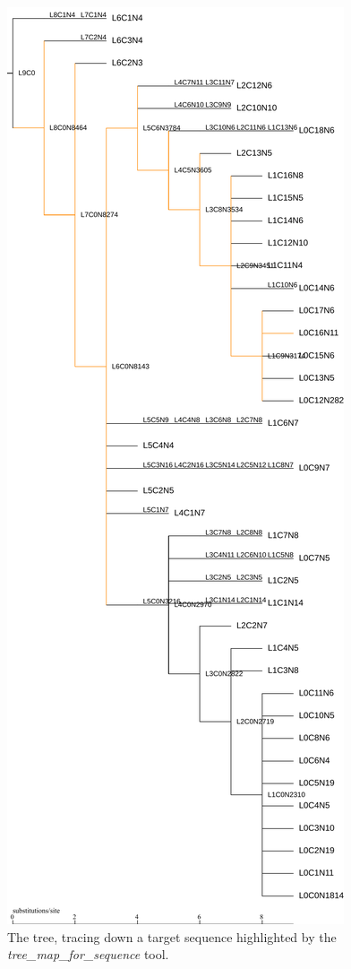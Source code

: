 \begin{figure}
  \begin{center}
    \includegraphics[scale=0.3]{nw-tree-sequence.pdf}
    \caption{The tree, tracing down a target sequence highlighted by
      the \emph{tree\_map\_for\_sequence} tool.}
    \label{fig-treemapseq-tutorial}
  \end{center}
\end{figure}

